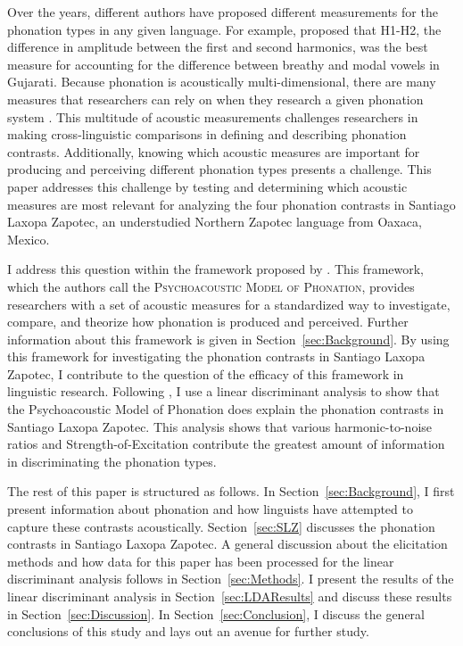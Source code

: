 \documentclass[12pt, letterpaper]{article}
\begin{document}
Over the years, different authors have proposed different measurements for the phonation types in any given language. For example, \citet{fischer-jorgensenPhoneticAnalysisBreathy1968} proposed that H1-H2, the difference in amplitude between the first and second harmonics, was the best measure for accounting for the difference between breathy and modal vowels in Gujarati. Because phonation is acoustically multi-dimensional, there are many measures that researchers can rely on when they research a given phonation system \citep{garellekAcousticDiscriminabilityComplex2020}. This multitude of acoustic measurements challenges researchers in making cross-linguistic comparisons in defining and describing phonation contrasts. Additionally, knowing which acoustic measures are important for producing and perceiving different phonation types presents a challenge. This paper addresses this challenge by testing and determining which acoustic measures are most relevant for analyzing the four phonation contrasts in Santiago Laxopa Zapotec, an understudied Northern Zapotec language from Oaxaca, Mexico. 

I address this question within the framework proposed by \citet{kreimanUnifiedTheoryVoice2014}. This framework, which the authors call the \textsc{Psychoacoustic Model of Phonation}, provides researchers with a set of acoustic measures for a standardized way to investigate, compare, and theorize how phonation is produced and perceived. Further information about this framework is given in Section~\ref{sec:Background}. By using this framework for investigating the phonation contrasts in Santiago Laxopa Zapotec, I contribute to the question of the efficacy of this framework in linguistic research. Following \citet{garellekAcousticDiscriminabilityComplex2020}, I use a linear discriminant analysis \citep{fisherUseMultipleMeasurements1936} to show that the Psychoacoustic Model of Phonation does explain the phonation contrasts in Santiago Laxopa Zapotec. This analysis shows that various harmonic-to-noise ratios and Strength-of-Excitation contribute the greatest amount of information in discriminating the phonation types. 

The rest of this paper is structured as follows. In Section~\ref{sec:Background}, I first present information about phonation and how linguists have attempted to capture these contrasts acoustically. Section~\ref{sec:SLZ} discusses the phonation contrasts in Santiago Laxopa Zapotec. A general discussion about the elicitation methods and how data for this paper has been processed for the linear discriminant analysis follows in Section~\ref{sec:Methods}. I present the results of the linear discriminant analysis in Section~\ref{sec:LDAResults} and discuss these results in Section~\ref{sec:Discussion}. In Section~\ref{sec:Conclusion}, I discuss the general conclusions of this study and lays out an avenue for further study.
\end{document}
